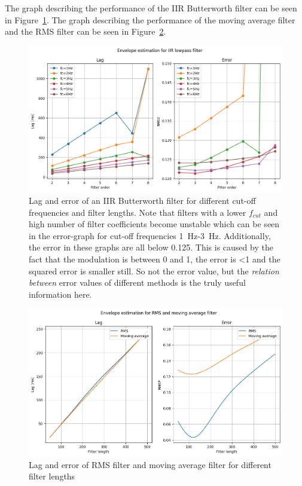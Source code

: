The graph describing the performance of the IIR Butterworth filter can be seen in Figure~\ref{fig:lagerror_iir}. The graph describing the performance of the moving average filter and the RMS filter can be seen in Figure~\ref{fig:lagerror_RMS_MA}.

\begin{figure}[h!t]
	\begin{center}
		\includegraphics[width=1.0\columnwidth]{images/lagerror_iirfilter.png}
	\end{center}
	\caption{Lag and error of an IIR Butterworth filter for different cut-off frequencies and filter lengths. Note that filters with a lower $f_{cut}$ and high number of filter coefficients become unstable which can be seen in the error-graph for cut-off frequencies \SI{1}{\hertz}-\SI{3}{\hertz}. Additionally, the error in these graphs are all below 0.125. This is caused by the fact that the modulation is between 0 and 1, the error is <1 and the squared error is smaller still. So not the error value, but the \textit{relation between} error values of different methods is the truly useful information here.}
	\label{fig:lagerror_iir}
\end{figure}

\begin{figure}[h!t]
	\begin{center}
		\includegraphics[width=1.0\columnwidth]{images/lagerror_rms_and_MA_filter.png}
	\end{center}
	\caption{Lag and error of RMS filter and moving average filter for different filter lengths}
	\label{fig:lagerror_RMS_MA}
\end{figure}

